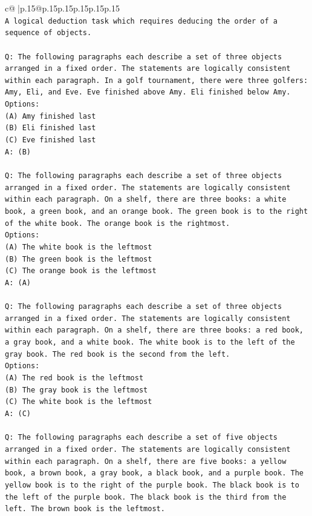 \documentclass{article}
\begin{document}
{\begin{supertabular}{c@{$\;$}|p{.15\linewidth}@{}p{.15\linewidth}p{.15\linewidth}p{.15\linewidth}p{.15\linewidth}p{.15\linewidth}}
{{{\\ 
\texttt{A logical deduction task which requires deducing the order of a sequence of objects.} \\
\\ 
\texttt{Q: The following paragraphs each describe a set of three objects arranged in a fixed order. The statements are logically consistent within each paragraph. In a golf tournament, there were three golfers: Amy, Eli, and Eve. Eve finished above Amy. Eli finished below Amy.} \\
\texttt{Options:} \\
\texttt{(A) Amy finished last} \\
\texttt{(B) Eli finished last} \\
\texttt{(C) Eve finished last} \\
\texttt{A: (B)} \\
\\ 
\texttt{Q: The following paragraphs each describe a set of three objects arranged in a fixed order. The statements are logically consistent within each paragraph. On a shelf, there are three books: a white book, a green book, and an orange book. The green book is to the right of the white book. The orange book is the rightmost.} \\
\texttt{Options:} \\
\texttt{(A) The white book is the leftmost} \\
\texttt{(B) The green book is the leftmost} \\
\texttt{(C) The orange book is the leftmost} \\
\texttt{A: (A)} \\
\\ 
\texttt{Q: The following paragraphs each describe a set of three objects arranged in a fixed order. The statements are logically consistent within each paragraph. On a shelf, there are three books: a red book, a gray book, and a white book. The white book is to the left of the gray book. The red book is the second from the left.} \\
\texttt{Options:} \\
\texttt{(A) The red book is the leftmost} \\
\texttt{(B) The gray book is the leftmost} \\
\texttt{(C) The white book is the leftmost} \\
\texttt{A: (C)} \\
\\ 
\texttt{Q: The following paragraphs each describe a set of five objects arranged in a fixed order. The statements are logically consistent within each paragraph. On a shelf, there are five books: a yellow book, a brown book, a gray book, a black book, and a purple book. The yellow book is to the right of the purple book. The black book is to the left of the purple book. The black book is the third from the left. The brown book is the leftmost.} \\
}}}
\end{supertabular}}
\end{document}
